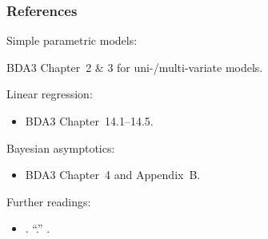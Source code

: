 \documentclass[18pt]{beamer}
\newenvironment{indented}[1][3]{%
	\hfill \begin{minipage}{\dimexpr\textwidth-#1ex} 
	}{
	\end{minipage}
}
\newenvironment{narrowItemize}[1][]{%
  \vspace{-.3\baselineskip}%
  \begin{itemize}[#1]
  \addtolength\itemsep{-.1\baselineskip}
}{
  \end{itemize}
}
\begin{document}
\newcommand{\bda}{BDA3}
\begin{frame}
\frametitle{References}

Simple parametric models:

\begin{indented}[4]
\bda{} Chapter~2 \& 3 for uni-/multi-variate models.
\end{indented}

Linear regression:
\begin{narrowItemize}
\item \bda{} Chapter~14.1--14.5.
\end{narrowItemize}

Bayesian asymptotics:
\begin{narrowItemize}
\item \bda{} Chapter~4 and Appendix~B.
\end{narrowItemize}

Further readings:
\begin{narrowItemize}
\item \cite{bayarri2004bayes_freq_interplay}.%
	``.''%
	\textit{}.
\end{narrowItemize}
\end{frame}
\end{document}
